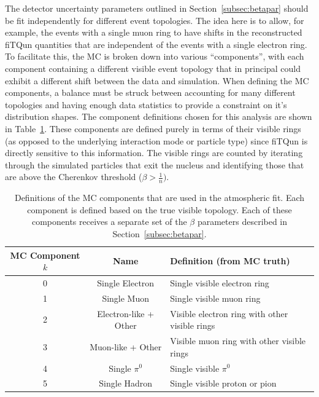 The detector uncertainty parameters outlined in Section~\ref{subsec:betapar}
should be fit independently for different event topologies. The idea here is to
allow, for example, the events with a single muon ring to have shifts in the
reconstructed fiTQun quantities that are independent of the events with a
single electron ring.  To facilitate this, the MC is broken down into various
``components'', with each component containing a different visible event
topology that in principal could exhibit a different shift between the data and
simulation.  When defining the MC components, a balance must be struck between
accounting for many different topologies and having enough data statistics to
provide a constraint on it's distribution shapes.  The component definitions
chosen for this analysis are shown in Table~\ref{tab:components}.  These
components are defined purely in terms of their visible rings (as opposed to
the underlying interaction mode or particle type) since fiTQun is directly
sensitive to this information.  The visible rings are counted by iterating
through the simulated particles that exit the nucleus and identifying those
that are above the Cherenkov threshold ($\beta > \frac{1}{n})$.

\begin{table}
  \centering
  \begin{tabular}{c | c | l }
    \hline\hline
    MC Component $k$ & Name & Definition (from MC truth) \\
    \hline
    0 & Single Electron & Single visible electron ring \\
    1 & Single Muon & Single visible muon ring  \\
    2 & Electron-like + Other & Visible electron ring with other visible rings  \\
    3 & Muon-like + Other & Visible muon ring with other visible rings  \\
    4 & Single $\pi^{0}$ & Single visible $\pi^{0}$  \\
    5 & Single Hadron &Single visible proton or pion  \\
    \hline\hline
  \end{tabular}
  \caption{Definitions of the MC components that are used in the atmospheric
  fit.  Each component is defined based on the true visible topology. Each of these
  components receives a separate set of the $\beta$ parameters described in
  Section~\ref{subsec:betapar}. }
  \label{tab:components}
\end{table}



